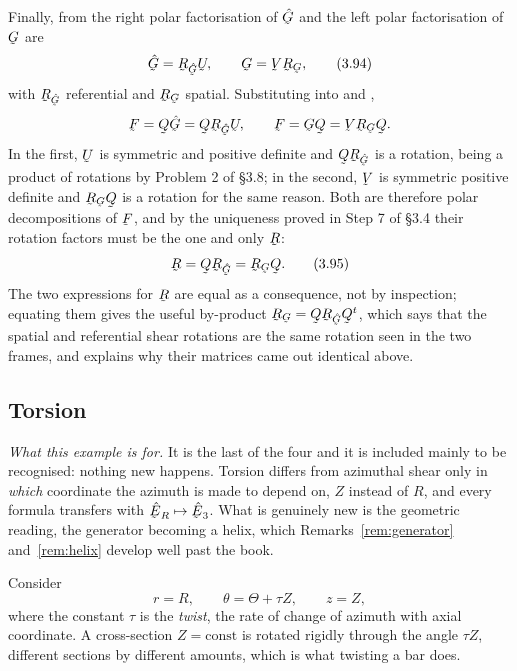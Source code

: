 Finally, from  the right polar factorisation of $\hat\bG$ and the
left polar factorisation of $\bG$ are
\begin{equation}
   \hat\bG=\bR_{\hat\bG}\bU,\qquad \bG=\bV\bR_{\bG},
   \tag{3.94}\label{eq:3.94}
\end{equation}
with $\bR_{\hat\bG}$ referential and $\bR_{\bG}$ spatial. Substituting
into  and ,
\[
   \bF=\bQ\hat\bG=\bQ\bR_{\hat\bG}\bU,
   \qquad
   \bF=\bG\bQ=\bV\bR_{\bG}\bQ .
\]
In the first, $\bU$ is symmetric and positive definite and
$\bQ\bR_{\hat\bG}$ is a rotation, being a product of rotations by
Problem 2 of \S3.8; in the second, $\bV$ is symmetric positive definite
and $\bR_{\bG}\bQ$ is a rotation for the same reason. Both are therefore
polar decompositions of $\bF$, and by the uniqueness proved in Step 7 of
\S3.4 their rotation factors must be the one and only $\bR$:
\begin{equation}
   \bR=\bQ\bR_{\hat\bG}=\bR_{\bG}\bQ .
   \tag{3.95}\label{eq:3.95}
\end{equation}
The two expressions for $\bR$ are equal as a consequence, not by
inspection; equating them gives the useful by-product
$\bR_{\bG}=\bQ\bR_{\hat\bG}\bQ^{t}$, which says that the spatial and
referential shear rotations are the same rotation seen in the two frames,
and explains why their matrices came out identical above.

\subsection{Torsion}\label{sec:torsion}

\emph{What this example is for.} It is the last of the four and it is
included mainly to be recognised: nothing new happens. Torsion differs
from azimuthal shear only in \emph{which} coordinate the azimuth is made
to depend on, $Z$ instead of $R$, and every formula transfers with
$\hER\mapsto\hbE_{3}$. What is genuinely new is the geometric reading, the
generator becoming a helix, which Remarks~\ref{rem:generator}
and~\ref{rem:helix} develop well past the book.

Consider
\begin{equation}
   r=R,\qquad \theta=\Theta+\tau Z,\qquad z=Z,
   \tag{3.96}\label{eq:3.96}
\end{equation}
where the constant $\tau$ is the \emph{twist}, the rate of change of
azimuth with axial coordinate. A cross-section $Z=\text{const}$ is rotated
rigidly through the angle $\tau Z$, different sections by different
amounts, which is what twisting a bar does.

